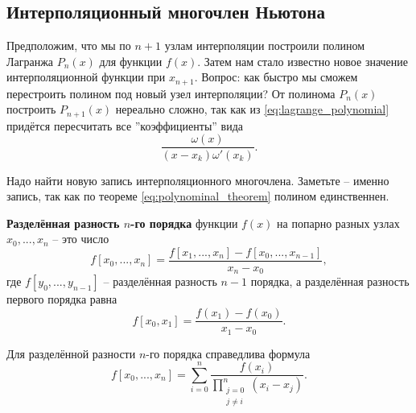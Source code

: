 \documentclass[../main.tex]{subfile}
\begin{document}
\subsection{Интерполяционный многочлен Ньютона}
Предположим, что мы по $n+1$ узлам интерполяции построили полином Лагранжа
$P_n(x)$ для функции $f(x)$. Затем нам стало известно новое значение
интерполяционной функции при $x_{n+1}$. Вопрос: как быстро мы сможем перестроить
полином под новый узел интерполяции? От полинома $P_n(x)$ построить $P_{n+1}(x)$
нереально сложно, так как из \eqref{eq:lagrange_polynomial} придётся пересчитать
все ''коэффициенты'' вида \[\frac{\omega(x)}{(x-x_k)\omega'(x_k)}.\]

Надо найти новую запись интерполяционного многочлена. Заметьте -- именно запись,
так как по теореме \eqref{eq:polynominal_theorem} полином единственнен.

\begin{define}\label{eq:divided_difference}
	\textbf{Разделённая разность $n$-го порядка} функции $f(x)$ на попарно
	разных узлах $x_0,...,x_n$ -- это число
	\[f[x_0,..., x_{n}]=\frac{f[x_1,...,x_n]-f[x_0,...,x_{n-1}]}
	{x_n-x_0},\]
	где $f[y_0,...,y_{n-1}]$ -- разделённая разность $n-1$ порядка, а
	разделённая разность первого порядка равна
	\[\boxed{f[x_0,x_1]=\frac{f(x_1)-f(x_0)}{x_1-x_0}}.\]
\end{define}

\begin{lemma}\label{eq:div_diff_formula}
	Для разделённой разности $n$-го порядка справедлива формула
	\[f[x_0,...,x_n]=\sum_{i=0}^{n}\frac{f(x_i)}
	{\prod_{\substack{j=0\\ j\neq i}}^{n}(x_i-x_j)}.\]
\end{lemma}
\end{document}
